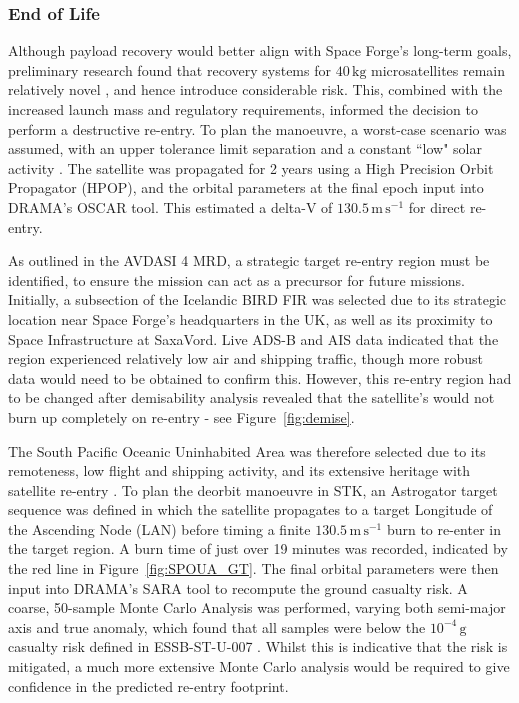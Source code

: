 \documentclass[a4paper, 11pt, conference]{IEEEtran}
\begin{document}
\subsubsection{End of Life}

Although payload recovery would better align with Space Forge's long-term goals, preliminary research found that recovery systems for $40\,\mathrm{kg}$ microsatellites remain relatively novel \cite{cassell_adept_2018} \cite{sannino_re-entry_2025}, and hence introduce considerable risk. This, combined with the increased launch mass and regulatory requirements, informed the decision to perform a destructive re-entry. To plan the manoeuvre, a worst-case scenario was assumed, with an upper tolerance limit separation and a constant ``low" solar activity \cite{noauthor_ecss-e-st-10-04c_nodate}. The satellite was propagated for 2 years using a High Precision Orbit Propagator (HPOP\label{nom:hpop}), and the orbital parameters at the final epoch input into DRAMA's OSCAR\label{nom:oscar} tool. This estimated a delta-V of $130.5\,\mathrm{m\,s}^{-1}$ for direct re-entry.

As outlined in the AVDASI\label{nom:avdasi} 4 MRD\label{nom:mrd}, a strategic target re-entry region must be identified, to ensure the mission can act as a precursor for future missions. Initially, a subsection of the Icelandic BIRD FIR\label{nom:fir} was selected due to its strategic location near Space Forge's headquarters in the UK, as well as its proximity to Space Infrastructure at SaxaVord. Live ADS-B\label{nom:adsb} \cite{flightradar24_live_nodate} and AIS\label{nom:ais} \cite{noauthor_ship_nodate} data indicated that the region experienced relatively low air and shipping traffic, though more robust data would need to be obtained to confirm this. However, this re-entry region had to be changed after demisability analysis revealed that the satellite's would not burn up completely on re-entry - see Figure~\ref{fig:demise}.


The South Pacific Oceanic Uninhabited Area was therefore selected due to its remoteness, low flight and shipping activity, and its extensive heritage with satellite re-entry \cite{ESA_reentry_2017}. To plan the deorbit manoeuvre in STK, an Astrogator target sequence was defined in which the satellite propagates to a target Longitude of the Ascending Node (LAN\label{nom:lan}) before timing a finite $130.5\,\mathrm{m\,s}^{-1}$ burn to re-enter in the target region. A burn time of just over 19 minutes was recorded, indicated by the red line in Figure~\ref{fig:SPOUA_GT}. The final orbital parameters were then input into DRAMA's SARA tool to recompute the ground casualty risk. A coarse, 50-sample Monte Carlo Analysis was performed, varying both semi-major axis and true anomaly, which found that all samples were below the $10^{-4}\,\mathrm{g}$ casualty risk defined in ESSB-ST-U-007 \cite{ESA_reentry_2023}. Whilst this is indicative that the risk is mitigated, a much more extensive Monte Carlo analysis would be required to give confidence in the predicted re-entry footprint.
\end{document}
